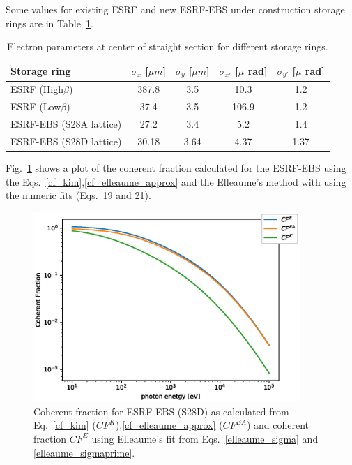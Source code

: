 \documentclass{iucr}              %
\begin{document}
Some values for existing ESRF and new ESRF-EBS under construction storage rings are in Table~\ref{table:sources}. 


\begin{table}
\caption{Electron parameters at center of straight section for different storage rings.}
\begin{tabular}{lcccc}      %
 Storage ring    & $\sigma_x$ [$\mu m$]       & $\sigma_y$ [$\mu m$]      & $\sigma_{x'}$  [$\mu$ rad] & $\sigma_{y'}$  [$\mu$ rad]    \\
\hline
 ESRF (High$\beta$)      & 387.8 & 3.5 & 10.3  & 1.2   \\
 ESRF (Low$\beta$)       & 37.4  & 3.5 & 106.9 & 1.2   \\
 ESRF-EBS (S28A lattice) & 27.2   & 3.4  & 5.2   & 1.4    \\
 ESRF-EBS (S28D lattice) & 30.18  & 3.64 & 4.37  & 1.37   \\
\end{tabular}
\label{table:sources}
\end{table}

Fig.~\ref{fig:CF} shows a plot of the coherent fraction calculated for the ESRF-EBS using the Eqs.~\ref{cf_kim},\ref{cf_elleaume_approx} and
the Elleaume's method with using the numeric fits (Eqs.~19 and 21).

\begin{figure}
  \centering
  \includegraphics[width=0.90\textwidth]{FIGURES/CF.eps} 
  \caption{Coherent fraction for ESRF-EBS (S28D) as calculated from Eq.~\ref{cf_kim} ($CF^K$),\ref{cf_elleaume_approx} ($CF^{EA}$) and coherent fraction $CF^E$ using  Elleaume's fit from Eqs.~\ref{elleaume_sigma} and \ref{elleaume_sigmaprime}.}
  \label{fig:CF}
\end{figure}
\end{document}
